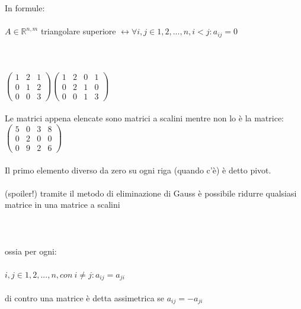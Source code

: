 \documentclass{report}
\begin{document}
In formule:
\\
\\
$ A \in \mathbb{R}^{n,m} $ triangolare superiore $ \leftrightarrow \forall i,j \in {1,2,...,n}, i < j : a_{ij} = 0$
\\
\\
\\
\\
$
\begin{pmatrix}
  1 & 2 & 1 \\
  0 & 1 & 2 \\
  0 & 0 & 3 
\end{pmatrix}
\begin{pmatrix}
  1 & 2 & 0 & 1 \\
  0 & 2 & 1 & 0 \\
  0 & 0 & 1 & 3
\end{pmatrix}
$
\\
\\
Le matrici appena elencate sono matrici a scalini mentre non lo è la matrice:
\\ 
$ 
\begin{pmatrix}
  5 & 0 & 3 & 8 \\
  0 & 2 & 0 & 0 \\
  0 & 9 & 2 & 6 
\end{pmatrix}
$
\\
\\
Il primo elemento diverso da zero su ogni riga (quando c'è) è detto pivot.
\\
\\
(spoiler!) tramite il metodo di eliminazione di Gauss è possibile ridurre qualsiasi matrice in una matrice a scalini
\\
\\
\\
\\
ossia per ogni:
\\
\\
$ i,j \in {1,2,...,n}, con \ i \neq j : a_{ij} = a_{ji}$
\\
\\
di contro una matrice è detta assimetrica se $a_{ij} = -a_{ji}$ 
\end{document}
